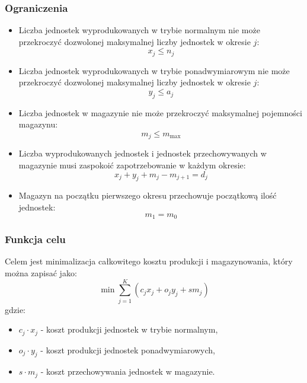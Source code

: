 \documentclass{article}
\begin{document}
\subsubsection{Ograniczenia}
\begin{itemize}
    \item Liczba jednostek wyprodukowanych w trybie normalnym nie może przekroczyć dozwolonej maksymalnej liczby jednostek w okresie $j$:
    \[
    x_j \leq n_j
    \]
    \item Liczba jednostek wyprodukowanych w trybie ponadwymiarowym nie może przekroczyć dozwolonej maksymalnej liczby jednostek w okresie $j$:
    \[
    y_j \leq a_j
    \]
    \item Liczba jednostek w magazynie nie może przekroczyć maksymalnej pojemności magazynu:
    \[
    m_j \leq m_{\text{max}}
    \]
    \item Liczba wyprodukowanych jednostek i jednostek przechowywanych w magazynie musi zaspokoić zapotrzebowanie w każdym okresie:
    \[
    x_j + y_j + m_j - m_{j + 1} = d_j
    \]
    \item Magazyn na początku pierwszego okresu przechowuje początkową ilość jednostek:
    \[
    m_1 = m_0
    \]
\end{itemize}

\subsubsection{Funkcja celu}
Celem jest minimalizacja całkowitego kosztu produkcji i magazynowania, który można zapisać jako:
\[
\min \sum_{j=1}^{K} (c_j x_j + o_j y_j + s m_j)
\]
gdzie:
\begin{itemize}
    \item $c_j \cdot x_j$ - koszt produkcji jednostek w trybie normalnym,
    \item $o_j \cdot y_j$ - koszt produkcji jednostek ponadwymiarowych,
    \item $s \cdot m_j$ - koszt przechowywania jednostek w magazynie.
\end{itemize}
\end{document}
